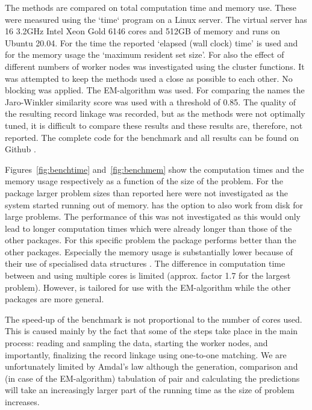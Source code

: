 The methods are compared on total computation time and memory use.  These were measured using the
`time` program on a Linux server. The virtual server has 16 3.2GHz Intel Xeon Gold 6146 cores and
512GB of memory and runs on Ubuntu 20.04. For the time the reported `elapsed (wall clock) time' is
used and for the memory usage the `maximum resident set size'. For  also the effect of
different numbers of worker nodes was investigated using the cluster functions. It was attempted to
keep the methods used a close as possible to each other. No blocking was applied. The EM-algorithm
was used. For comparing the names the Jaro-Winkler similarity score was used with a threshold of
0.85. The quality of the resulting record linkage was recorded, but as the methods were not
optimally tuned, it is difficult to compare these results and these results are, therefore, not
reported. The complete code for the benchmark and all results can be found on Github
\citep{benchmark}.

Figures~\ref{fig:benchtime} and~\ref{fig:benchmem} show the computation times and the memory usage
respectively as a function of the size of the problem. For the  package larger
problem sizes than reported here were not investigated as the system started running out of memory.
 has the option to also work from disk for large problems. The performance of
this was not investigated as this would only lead to longer computation times which were already
longer than those of the other packages. For this specific problem the  package
performs better than the other packages. Especially the memory usage is substantially lower because
of their use of specialised data structures \citep{fastlink2}. The
difference in computation time between  and  using multiple cores is
limited (approx. factor 1.7 for the largest problem).  However,  is tailored for use
with the EM-algorithm while the other packages are more general. 

The speed-up of the  benchmark is not proportional to the number of cores used. This is
caused mainly by the fact that some of the steps take place in the main process: reading and
sampling the data, starting the worker nodes, and importantly, finalizing the record linkage using
one-to-one matching. We are unfortunately limited by Amdal's law \citep{amdahl} although the
generation, comparison and (in case of the EM-algorithm) tabulation of pair and calculating the
predictions will take an increasingly larger part of the running time as the size of problem
increases.

